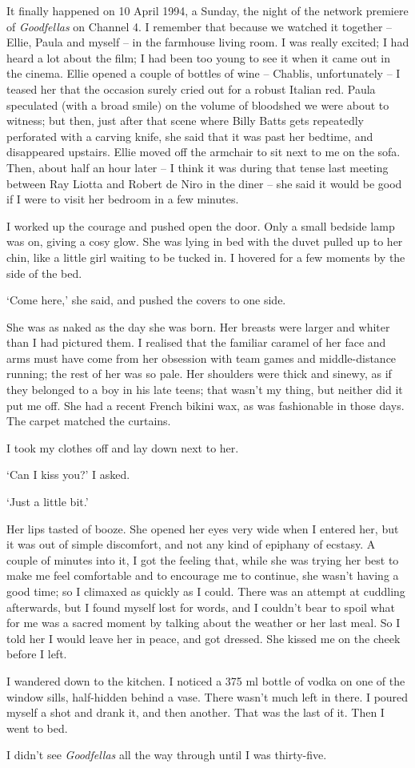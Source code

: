 It finally happened on 10 April 1994, a Sunday, the night of the network premiere of \textit{Goodfellas} on Channel 4. I remember that because we watched it together -- Ellie, Paula and myself -- in the farmhouse living room. I was really excited; I had heard a lot about the film; I had been too young to see it when it came out in the cinema. Ellie opened a couple of bottles of wine -- Chablis, unfortunately -- I teased her that the occasion surely cried out for a robust Italian red. Paula speculated (with a broad smile) on the volume of bloodshed we were about to witness; but then, just after that scene where Billy Batts gets repeatedly perforated with a carving knife, she said that it was past her bedtime, and disappeared upstairs. Ellie moved off the armchair to sit next to me on the sofa. Then, about half an hour later -- I think it was during that tense last meeting between Ray Liotta and Robert de Niro in the diner -- she said it would be good if I were to visit her bedroom in a few minutes.

I worked up the courage and pushed open the door. Only a small bedside lamp was on, giving a cosy glow. She was lying in bed with the duvet pulled up to her chin, like a little girl waiting to be tucked in. I hovered for a few moments by the side of the bed.

`Come here,' she said, and pushed the covers to one side.

She was as naked as the day she was born. Her breasts were larger and whiter than I had pictured them. I realised that the familiar caramel of her face and arms must have come from her obsession with team games and middle-distance running; the rest of her was so pale. Her shoulders were thick and sinewy, as if they belonged to a boy in his late teens; that wasn't my thing, but neither did it put me off. She had a recent French bikini wax, as was fashionable in those days. The carpet matched the curtains.

I took my clothes off and lay down next to her.

`Can I kiss you?' I asked.

`Just a little bit.'

Her lips tasted of booze. She opened her eyes very wide when I entered her, but it was out of simple discomfort, and not any kind of epiphany of ecstasy. A couple of minutes into it, I got the feeling that, while she was trying her best to make me feel comfortable and to encourage me to continue, she wasn't having a good time; so I climaxed as quickly as I could. There was an attempt at cuddling afterwards, but I found myself lost for words, and I couldn't bear to spoil what for me was a sacred moment by talking about the weather or her last meal. So I told her I would leave her in peace, and got dressed. She kissed me on the cheek before I left.

I wandered down to the kitchen. I noticed a 375 ml bottle of vodka on one of the window sills, half-hidden behind a vase. There wasn't much left in there. I poured myself a shot and drank it, and then another. That was the last of it. Then I went to bed.

I didn't see \textit{Goodfellas} all the way through until I was thirty-five.
